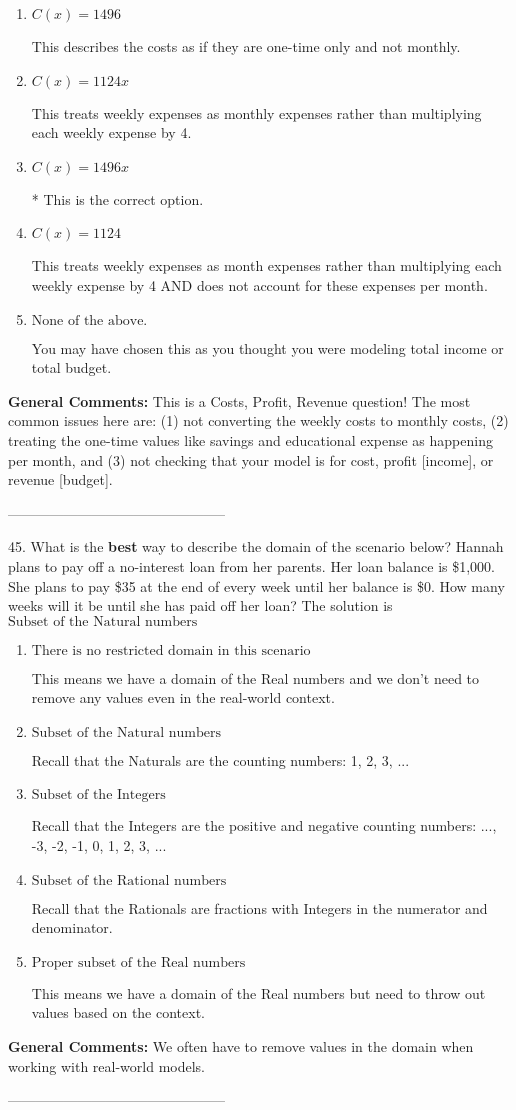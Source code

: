 \documentclass{extbook}[14pt]
\begin{document}
\begin{enumerate}[label=\Alph*.] 
\item $ C(x) = 1496 $ 

 This describes the costs as if they are one-time only and not monthly. 
\item $ C(x) = 1124 x $ 

 This treats weekly expenses as monthly expenses rather than multiplying each weekly expense by 4. 
\item $ C(x) = 1496 x $ 

 * This is the correct option. 
\item $ C(x) = 1124 $ 

 This treats weekly expenses as month expenses rather than multiplying each weekly expense by 4 AND does not account for these expenses per month. 
\item $ \text{None of the above.} $ 

 You may have chosen this as you thought you were modeling total income or total budget. 
\end{enumerate} 
 
\textbf{General Comments:} This is a Costs, Profit, Revenue question! The most common issues here are: (1) not converting the weekly costs to monthly costs, (2) treating the one-time values like savings and educational expense as happening per month, and (3) not checking that your model is for cost, profit [income], or revenue [budget].

-----------------------------------------------

45. What is the \textbf{best} way to describe the domain of the scenario below?
Hannah plans to pay off a no-interest loan from her parents. Her loan balance is \$1,000. She plans to pay \$35 at the end of every week until her balance is \$0. How many weeks will it be until she has paid off her loan? 
The solution is $ \text{Subset of the Natural numbers} $ 

\begin{enumerate}[label=\Alph*.] 
\item $ \text{There is no restricted domain in this scenario} $ 

 This means we have a domain of the Real numbers and we don't need to remove any values even in the real-world context. 
\item $ \text{Subset of the Natural numbers} $ 

 Recall that the Naturals are the counting numbers: 1, 2, 3, ... 
\item $ \text{Subset of the Integers} $ 

 Recall that the Integers are the positive and negative counting numbers: ..., -3, -2, -1, 0, 1, 2, 3, ...  
\item $ \text{Subset of the Rational numbers} $ 

 Recall that the Rationals are fractions with Integers in the numerator and denominator. 
\item $ \text{Proper subset of the Real numbers} $ 

 This means we have a domain of the Real numbers but need to throw out values based on the context. 
\end{enumerate} 
 
\textbf{General Comments:} We often have to remove values in the domain when working with real-world models.

-----------------------------------------------
\end{document}
